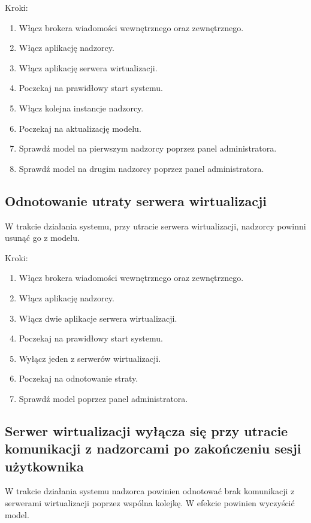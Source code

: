 \documentclass[12pt]{article}
\begin{document}
Kroki:
\begin{enumerate}
	\item Włącz brokera wiadomości wewnętrznego oraz zewnętrznego.
	\item Włącz aplikację nadzorcy.
	\item Włącz aplikację serwera wirtualizacji.
	\item Poczekaj na prawidłowy start systemu.
	\item Włącz kolejna instancje nadzorcy.
	\item Poczekaj na aktualizację modelu.
	\item Sprawdź model na pierwszym nadzorcy poprzez panel administratora.
	\item Sprawdź model na drugim nadzorcy poprzez panel administratora.
\end{enumerate}

\subsection {Odnotowanie utraty serwera wirtualizacji}
W trakcie działania systemu, przy utracie serwera wirtualizacji, nadzorcy powinni usunąć go z modelu.

Kroki:
\begin{enumerate}
	\item Włącz brokera wiadomości wewnętrznego oraz zewnętrznego.
	\item Włącz aplikację nadzorcy.
	\item Włącz dwie aplikacje serwera wirtualizacji.
	\item Poczekaj na prawidłowy start systemu.
	\item Wyłącz jeden z serwerów wirtualizacji.
	\item Poczekaj na odnotowanie straty.
	\item Sprawdź model poprzez panel administratora.
\end{enumerate}

\subsection {Serwer wirtualizacji wyłącza się przy utracie komunikacji z nadzorcami po zakończeniu sesji użytkownika}
W trakcie działania systemu nadzorca powinien odnotować brak komunikacji z serwerami wirtualizacji poprzez wspólna kolejkę.
W efekcie powinien wyczyścić model.
\end{document}
